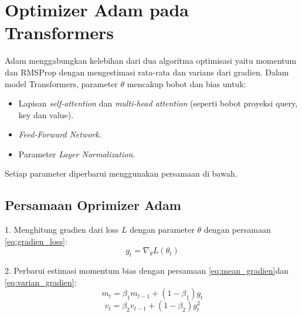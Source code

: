     \section{Optimizer Adam pada Transformers}
    Adam menggabungkan kelebihan dari dua algoritma optimisasi yaitu momentum dan RMSProp dengan mengestimasi rata-rata dan varians dari gradien. Dalam model Transformers, parameter $\theta$ mencakup bobot dan bias untuk:
\begin{itemize}
    \item Lapisan \textit{self-attention} dan \textit{multi-head attention} (seperti bobot proyeksi query, key dan value).
    \item \textit{Feed-Forward Network}.
    \item Parameter \textit{Layer Normalization}.
\end{itemize}
Setiap parameter diperbarui menggunakan persamaan di bawah.

\subsection{Persamaan Oprimizer Adam}

1. Menghitung gradien dari loss \( L \) dengan parameter \( \theta \) dengan persamaan \ref{eq:gradien_loss}:
\begin{equation}
    g_t = \nabla_{\theta} L(\theta_t)
    \label{eq:gradien_loss}
\end{equation}

2. Perbarui estimasi momentum bias dengan persamaan \ref{eq:mean_gradien}dan \ref{eq:varian_gradien}:
\begin{equation}
    m_t = \beta_1 m_{t-1} + (1 - \beta_1) g_t
    \label{eq:mean_gradien}
\end{equation}
\begin{equation}
    v_t = \beta_2 v_{t-1} + (1 - \beta_2) g_t^2
    \label{eq:varian_gradien}
\end{equation}

